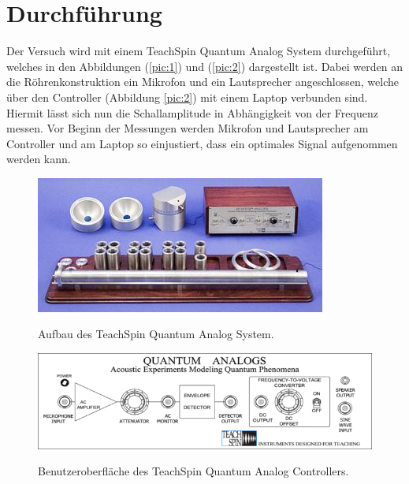 \section{Durchführung}
Der Versuch wird mit einem TeachSpin Quantum Analog System durchgeführt, welches in den Abbildungen
(\ref{pic:1}) und (\ref{pic:2}) dargestellt ist. Dabei werden an die Röhrenkonstruktion ein Mikrofon und ein Lautsprecher
angeschlossen, welche über den Controller (Abbildung \ref{pic:2}) mit einem Laptop verbunden sind. Hiermit lässt
sich nun die Schallamplitude in Abhängigkeit von der Frequenz messen. Vor Beginn der Messungen werden Mikrofon und Lautsprecher am
Controller und am Laptop so einjustiert, dass ein optimales Signal aufgenommen werden kann.

\begin{figure}[H]
  \centering
  \includegraphics[scale=.75]{pic1.jpg}
  \caption{Aufbau des TeachSpin Quantum Analog System.} \cite{durch1}
\end{figure}

\begin{figure}[H]
  \centering
  \includegraphics[scale=.75]{pic2.png}
  \caption{Benutzeroberfläche des TeachSpin Quantum Analog Controllers.} \cite{durch1}
\end{figure}

